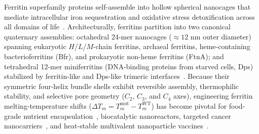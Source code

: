 \documentclass[12pt,a4paper]{article}
\newcommand{\DTm}{\ensuremath{\Delta T_m}}
\begin{document}
Ferritin superfamily proteins self-assemble into hollow spherical nanocages that mediate intracellular iron sequestration and oxidative stress detoxification across all domains of life~\cite{tan2021mjfer,zhang2011protsci}. Architecturally, ferritins partition into two canonical quaternary assemblies: octahedral 24-mer nanocages ($\approx 12\text{ nm}$ outer diameter) spanning eukaryotic $H$/$L$/$M$-chain ferritins, archaeal ferritins, heme-containing bacterioferritins (Bfr), and prokaryotic non-heme ferritins (FtnA); and tetrahedral 12-mer miniferritins (DNA-binding proteins from starved cells, Dps) stabilized by ferritin-like and Dps-like trimeric interfaces~\cite{zhang2010jbc,zhang2011protsci}. Because their symmetric four-helix bundle shells exhibit reversible assembly, thermophilic stability, and selective pore geometry ($C_2$, $C_3$, and $C_4$ axes), engineering ferritin melting-temperature shifts ($\DTm = T_m^{\text{mut}} - T_m^{\text{WT}}$) has become pivotal for food-grade nutrient encapsulation~\cite{li2021foodchem}, biocatalytic nanoreactors, targeted cancer nanocarriers~\cite{falvo2012cgt}, and heat-stable multivalent nanoparticle vaccines~\cite{npjv2026}.
\end{document}
